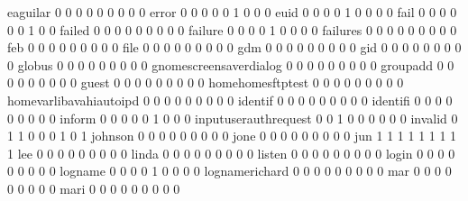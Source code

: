 \documentclass[compress,8pt]{beamer}
\begin{document}
\begin{frame}
\begin{Schunk}
  eaguilar                                   0   0   0   0   0   0   0   0   0
  error                                      0   0   0   0   0   1   0   0   0
  euid                                       0   0   0   0   1   0   0   0   0
  fail                                       0   0   0   0   0   0   1   0   0
  failed                                     0   0   0   0   0   0   0   0   0
  failure                                    0   0   0   0   1   0   0   0   0
  failures                                   0   0   0   0   0   0   0   0   0
  feb                                        0   0   0   0   0   0   0   0   0
  file                                       0   0   0   0   0   0   0   0   0
  gdm                                        0   0   0   0   0   0   0   0   0
  gid                                        0   0   0   0   0   0   0   0   0
  globus                                     0   0   0   0   0   0   0   0   0
  gnomescreensaverdialog                     0   0   0   0   0   0   0   0   0
  groupadd                                   0   0   0   0   0   0   0   0   0
  guest                                      0   0   0   0   0   0   0   0   0
  homehomesftptest                           0   0   0   0   0   0   0   0   0
  homevarlibavahiautoipd                     0   0   0   0   0   0   0   0   0
  identif                                    0   0   0   0   0   0   0   0   0
  identifi                                   0   0   0   0   0   0   0   0   0
  inform                                     0   0   0   0   0   1   0   0   0
  inputuserauthrequest                       0   0   1   0   0   0   0   0   0
  invalid                                    0   1   1   0   0   0   1   0   1
  johnson                                    0   0   0   0   0   0   0   0   0
  jone                                       0   0   0   0   0   0   0   0   0
  jun                                        1   1   1   1   1   1   1   1   1
  lee                                        0   0   0   0   0   0   0   0   0
  linda                                      0   0   0   0   0   0   0   0   0
  listen                                     0   0   0   0   0   0   0   0   0
  login                                      0   0   0   0   0   0   0   0   0
  logname                                    0   0   0   0   1   0   0   0   0
  lognamerichard                             0   0   0   0   0   0   0   0   0
  mar                                        0   0   0   0   0   0   0   0   0
  mari                                       0   0   0   0   0   0   0   0   0

\end{Schunk}
\end{frame}
\end{document}
